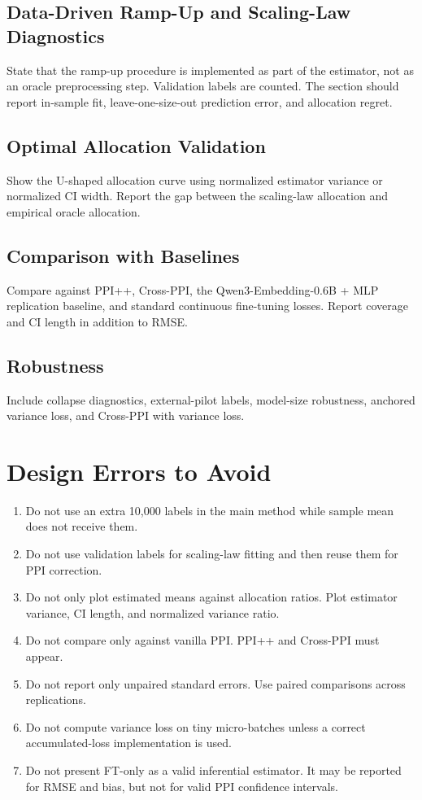 \documentclass[11pt]{article}
\begin{document}
\subsection{Data-Driven Ramp-Up and Scaling-Law Diagnostics}

State that the ramp-up procedure is implemented as part of the estimator, not as an oracle preprocessing step. Validation labels are counted. The section should report in-sample fit, leave-one-size-out prediction error, and allocation regret.

\subsection{Optimal Allocation Validation}

Show the U-shaped allocation curve using normalized estimator variance or normalized CI width. Report the gap between the scaling-law allocation and empirical oracle allocation.

\subsection{Comparison with Baselines}

Compare against PPI++, Cross-PPI, the Qwen3-Embedding-0.6B + MLP replication baseline, and standard continuous fine-tuning losses. Report coverage and CI length in addition to RMSE.

\subsection{Robustness}

Include collapse diagnostics, external-pilot labels, model-size robustness, anchored variance loss, and Cross-PPI with variance loss.

\section{Design Errors to Avoid}

\begin{enumerate}
    \item Do not use an extra 10,000 labels in the main method while sample mean does not receive them.
    \item Do not use validation labels for scaling-law fitting and then reuse them for PPI correction.
    \item Do not only plot estimated means against allocation ratios. Plot estimator variance, CI length, and normalized variance ratio.
    \item Do not compare only against vanilla PPI. PPI++ and Cross-PPI must appear.
    \item Do not report only unpaired standard errors. Use paired comparisons across replications.
    \item Do not compute variance loss on tiny micro-batches unless a correct accumulated-loss implementation is used.
    \item Do not present FT-only as a valid inferential estimator. It may be reported for RMSE and bias, but not for valid PPI confidence intervals.
\end{enumerate}
\end{document}

